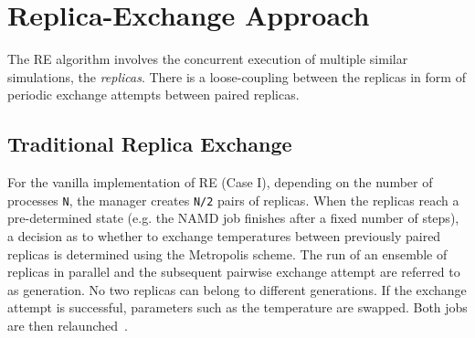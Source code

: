 \documentclass[a4paper,10pt]{article}
\newcommand{\jhanote}[1]{ {\textcolor{red} { ***shantenu: #1 }}}
\newcommand{\alnote}[1]{ {\textcolor{blue} { ***andre: #1 }}}
\newcommand{\alnote}[1]{}
\newcommand{\jhanote}[1]{}
\begin{document}

\section{Replica-Exchange Approach}

The RE algorithm involves the concurrent execution of multiple similar
simulations, the \emph{replicas}.  There is a loose-coupling between
the replicas in form of periodic exchange attempts between paired
replicas. %


\subsection{Traditional Replica Exchange}
For the vanilla implementation of RE (Case I), depending
on the number of processes \texttt{N}, the manager creates \texttt{N/2} pairs
of replicas. When the replicas reach a
pre-determined state (e.g. the NAMD job finishes after a fixed number
of steps), a decision as to whether to exchange temperatures between
previously paired replicas is determined using the Metropolis scheme.
The run of an ensemble of replicas in parallel and the subsequent
pairwise exchange attempt are referred to as generation. No two
replicas can belong to different generations. If the exchange attempt
is successful, parameters such as the temperature are swapped. Both
jobs are then relaunched~\cite{Luckow:2008fp}.
\end{document}
